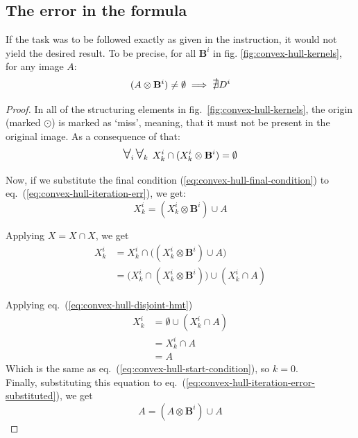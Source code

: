 \documentclass[12pt]{article}
\begin{document}
\pagebreak[3 ]
\subsection*{The error in the formula}

If the task was to be followed exactly as given in the instruction, it would not yield the desired result.
To be precise, for all $\mathbf{B}^i$ in fig. \ref{fig:convex-hull-kernels}, for any image $A$:
\begin{equation*}
    (A \otimes \mathbf{B}^i) \neq \emptyset \implies \mbox{\large$\mathsurround0pt\nexists$} D^i
\end{equation*}

\begin{proof}
    In all of the structuring elements in fig.~\ref{fig:convex-hull-kernels}, the origin (marked $\odot$) is marked as `miss', meaning, that it must not be present in the original image.
    As a consequence of that:
    \begin{equation}
        \biggerforall\nolimits_i\biggerforall\nolimits_k \; X^i_k \cap (X^i_k \otimes \mathbf{B}^i) = \emptyset
        \label{eq:convex-hull-disjoint-hmt}
    \end{equation}

    Now, if we substitute the final condition (\ref{eq:convex-hull-final-condition}) to eq.~(\ref{eq:convex-hull-iteration-err}), we get:
    \begin{equation}
        X^i_k = (X^i_k \otimes \mathbf{B}^i) \cup A
        \label{eq:convex-hull-iteration-error-substituted}
    \end{equation}

    Applying $X = X \cap X$, we get
    \begin{align}
        X^i_k & = X^i_k \cap \big((X^i_k \otimes \mathbf{B}^i) \cup A \big) \nonumber    \\
              & = \big(X^i_k \cap (X^i_k \otimes \mathbf{B}^i) \big) \cup (X^i_k \cap A)
    \end{align}

    Applying eq.~(\ref{eq:convex-hull-disjoint-hmt})
    \begin{align}
        X^i_k & = \emptyset \cup (X^i_k \cap A) \nonumber \\
              & = X^i_k \cap A \nonumber                  \\
              & = A \label{eq:convex-hull-only-zero-k}
    \end{align}
    Which is the same as eq.~(\ref{eq:convex-hull-start-condition}), so $k=0$.\\
    Finally, substituting this equation to eq.~(\ref{eq:convex-hull-iteration-error-substituted}), we get
    \begin{equation}
        A = (A \otimes \mathbf{B}^i) \cup A
    \end{equation}


\end{proof}
\end{document}
